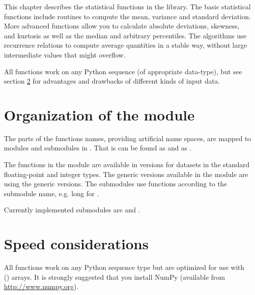 
This chapter describes the statistical functions in the library.  The basic
statistical functions include routines to compute the mean, variance and
standard deviation. More advanced functions allow you to calculate absolute
deviations, skewness, and kurtosis as well as the median and arbitrary
percentiles.  The algorithms use recurrence relations to compute average
quantities in a stable way, without large intermediate values that might
overflow.

All functions work on any Python sequence (of appropriate data-type), but see
section \ref{sec:stat-speed-considerations} for advantages and drawbacks of
different kinds of input data.


\section{Organization of the module}
\label{sec:stat-organization}

The parts of the \gsl{} functions names, providing artificial name spaces, are
mapped to modules and submodules in \pygsl{}.  That is 
can be found as  and  as
.

The functions in the module are available in versions for datasets in the
standard floating-point and integer types. The generic versions available in
the  module are using the generic \gsl{} 
versions.  The submodules use \gsl{} functions according to the submodule name,
e.g. long for .

Currently implemented submodules are  and
.



\section{Speed considerations}
\label{sec:stat-speed-considerations}

All functions work on any Python sequence type but are optimized for use with
\NUMPY{} (\numpy{}) arrays. It is strongly suggested that you install NumPy
(available from \url{http://www.numpy.org}).

